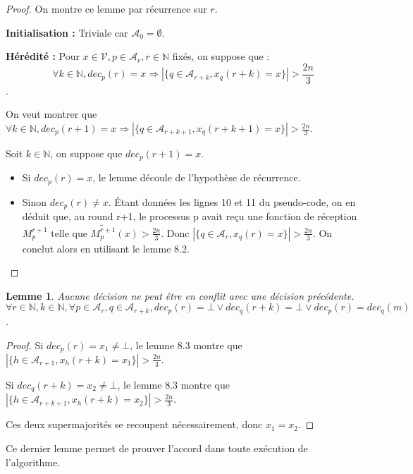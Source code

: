 \documentclass{article}
\newtheorem{lemma}{Lemme}[section]
\begin{document}
\begin{proof}

On montre ce lemme par récurrence sur $r$.

\textbf{Initialisation :}
	Triviale car $\mathcal{A}_0 = \emptyset$.

\textbf{Hérédité :}
	Pour $x \in \mathcal{V}, p \in \mathcal{A}_r, r \in \mathds{N}$ fixés, on suppose que :
	$$ \forall k \in \mathds{N}, dec_p(r) = x \Rightarrow| \{ q \in \mathcal{A}_{r+k} , x_q(r+k) = x \} | > \frac{2 n}{3}$$.

	On veut montrer que 
	$ \forall k \in \mathds{N}, dec_p(r+1) = x \Rightarrow| \{ q \in \mathcal{A}_{r+k+1} , x_q(r+k+1) = x \} | > \frac{2 n}{3}$.

	Soit $k \in \mathds{N}$, on suppose que $dec_p(r+1) = x$.

	\begin{itemize}

		\item Si $dec_p(r) = x$, le lemme découle de l'hypothèse de récurrence.
		\item Sinon $dec_p(r) \neq x$. Étant données les lignes 10 et 11 du pseudo-code,
			on en déduit que, au round r+1, le processus p avait reçu une fonction de réception $M_p^{r+1}$ telle que $\widetilde{M_p^{r+1}}(x) > \frac{2 n}{3}$.
			Donc $| \{ q \in \mathcal{A}_r , x_q(r) = x \} | > \frac{2 n}{3}$.
			On conclut alors en utilisant le lemme 8.2.

	\end{itemize}
\end{proof}

\begin{lemma}
	Aucune décision ne peut être en conflit avec une décision précédente.
	$$ \forall r \in \mathds{N}, k \in \mathds{N}, \forall p \in \mathcal{A}_r, q \in \mathcal{A}_{r+k},dec_p(r) = \bot \vee dec_q(r+k) = \bot \vee dec_p(r) = dec_q(m)$$.
\end{lemma}
\begin{proof}

	Si $dec_p(r) = x_1 \neq \bot$,   le lemme 8.3 montre que $|\{h \in \mathcal{A}_{r+1}, x_h(r+k) = x_1\}| > \frac{2 n}{3}$.

	Si $dec_q(r+k) = x_2 \neq \bot$,   le lemme 8.3 montre que $|\{h \in \mathcal{A}_{r+k+1}, x_h(r+k) = x_2\}|> \frac{2 n}{3}$.

Ces deux supermajorités se recoupent nécessairement, donc $x_1 = x_2$.
\end{proof}

Ce dernier lemme permet de prouver l'accord dans toute exécution de l'algorithme.
\end{document}
